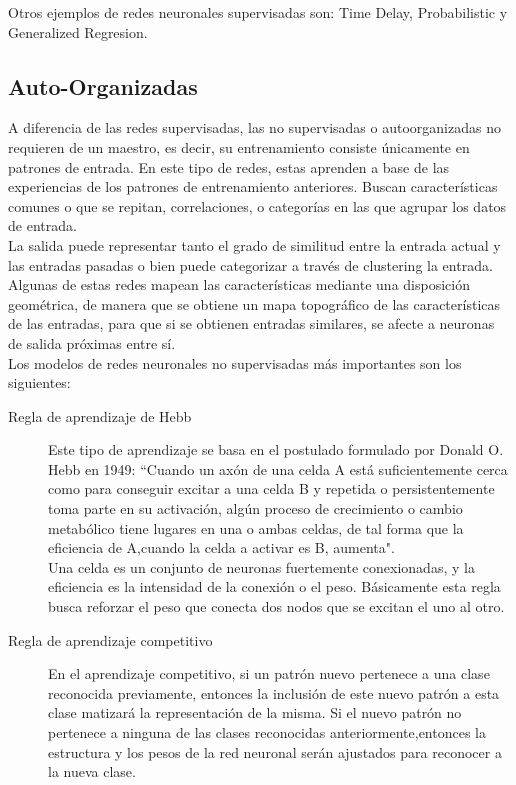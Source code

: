 \documentclass[11pt, oneside]{article}   	%
\begin{document}
Otros ejemplos de redes neuronales supervisadas son: Time Delay, Probabilistic y Generalized Regresion.

\subsection{Auto-Organizadas}

A diferencia de las redes supervisadas, las no supervisadas o autoorganizadas no requieren de un maestro, es decir, su
entrenamiento consiste únicamente en patrones de entrada. En este tipo de redes, estas aprenden a base de las
experiencias de los patrones de entrenamiento anteriores. Buscan características comunes o que se repitan,
correlaciones, o categorías en las que agrupar los datos de entrada.\\
La salida puede representar tanto el grado de similitud entre la entrada actual y las entradas pasadas o bien puede
categorizar a través de clustering la entrada.\\

Algunas de estas redes mapean las características mediante una disposición geométrica, de manera que se obtiene un mapa
topográfico de las características de las entradas, para que si se obtienen entradas similares, se afecte a neuronas de
salida próximas entre sí.\\

Los modelos de redes neuronales no supervisadas más importantes son los siguientes:

\begin{description}
  \item[Regla de aprendizaje de Hebb]
    Este tipo de aprendizaje se basa en el postulado formulado por Donald O. Hebb en
    1949: ``Cuando un axón de una celda A está suficientemente cerca como para conseguir excitar a una celda B y repetida o
    persistentemente toma parte en su activación, algún proceso de crecimiento o cambio metabólico tiene lugares en una o
    ambas celdas, de tal forma que la eficiencia de A,cuando la celda a activar es B, aumenta". \\
    Una celda es un conjunto de neuronas fuertemente conexionadas, y la eficiencia es la intensidad de la conexión o el peso.
    Básicamente esta regla busca reforzar el peso que conecta dos nodos que se excitan el uno al otro. 

  \item[Regla de aprendizaje competitivo]
    En el aprendizaje competitivo, si un patrón nuevo pertenece a una clase
    reconocida previamente, entonces la inclusión de este nuevo patrón a esta clase matizará la representación de la misma.
    Si el nuevo patrón no pertenece a ninguna de las clases reconocidas anteriormente,entonces la estructura y los pesos de
    la red neuronal serán ajustados para reconocer a la nueva clase.
\end{description}
\end{document}
